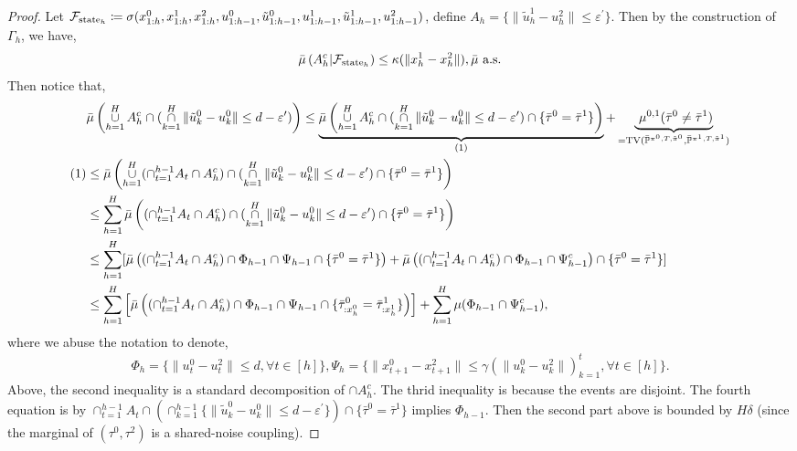 \documentclass{article}
\begin{document}
\begin{proof}
Let $\mathcal F_{\textnormal{state}_h}\coloneqq \sigma(x^0_{1:h},x^1_{1:h},x_{1:h}^2,u_{1:h-1}^{0},\tilde u^0_{1:h-1},u^1_{1:h-1},\tilde u^1_{1:h-1}, u_{1:h-1}^2 )$, define $A_h=\{\|\tilde u_h^1-u_h^2\|\leq\varepsilon^\prime\}$.
    Then by the construction of $\Gamma_h$, we have,
    \begin{equation*}
        \bar \mu\left(A_h^c|\mathcal F_{\textnormal{state}_h}\right)\leq\kappa(\|x_h^1-x_h^2\|), \bar \mu \textnormal{ a.s.}
    \end{equation*}
    Then notice that,
    \begin{align*}
        &\bar \mu\left(\mathop{\cup}_{h=1}^H A_h^c\cap (\mathop{\cap}_{k=1}^H \|\tilde u_k^0-u_k^0\| \leq d-\varepsilon^\prime)\right)\leq \underbrace{\bar \mu\left(\mathop{\cup}_{h=1}^H A_h^c\cap (\mathop{\cap}_{k=1}^H \|\tilde u_k^0-u_k^0\| \leq d-\varepsilon^\prime)\cap\{\bar \tau^0=\bar \tau^1\}\right)}_{(1)}+\underbrace{\ \mu^{0,1}(\bar \tau^0 \neq \bar \tau^1)}_{=\textnormal{TV}(\bar {\mathbb P}^{\pi^0,T,\tilde \pi^0},\bar {\mathbb P}^{\pi^1,T,\tilde \pi^1})}\\
(1)&\leq \bar \mu\left(\mathop{\cup}_{h=1}^H (\cap_{t=1}^{h-1}A_t\cap A_h^c)\cap (\mathop{\cap}_{k=1}^H \|\tilde u_k^0-u_k^0\|\leq d-\varepsilon^\prime)\cap\{\bar \tau^0=\bar \tau^1\}\right)\\
        & \leq \sum_{h=1}^H \bar \mu\left((\cap_{t=1}^{h-1}A_t\cap A_h^c)\cap (\mathop{\cap}_{k=1}^H \|\tilde u_k^0-u_k^0\|\leq d-\varepsilon^\prime)\cap\{\bar \tau^0=\bar \tau^1\}\right)\\
        &\leq \sum_{h=1}^H[\bar \mu\left((\cap_{t=1}^{h-1}A_t\cap A_h^c)\cap \Phi_{h-1}\cap \Psi_{h-1}\cap\{\bar \tau^0=\bar \tau^1\}\right)+\bar \mu\left((\cap_{t=1}^{h-1}A_t\cap A_h^c)\cap \Phi_{h-1}\cap \Psi_{h-1}^c\right)\cap\{\bar \tau^0=\bar \tau^1\}]\\
        &\leq \sum_{h=1}^H\left[\bar \mu\left((\cap_{t=1}^{h-1}A_t\cap A_h^c)\cap \Phi_{h-1}\cap \Psi_{h-1}\cap\{\bar \tau^0_{:x_h^0}=\bar \tau^1_{:x_h^1}\}\right)\right]+\sum_{h=1}^H \mu(\Phi_{h-1}\cap \Psi_{h-1}^c),
    \end{align*}
    where we abuse the notation to denote,
\begin{align*}
    \Phi_h = \{\|u_t^0-u_t^2\|\leq d, \forall t\in[h]\}, \Psi_h = \{\|x_{t+1}^0-x_{t+1}^2\|\leq \gamma(\|u^0_k-u^2_k\|)_{k=1}^t,\forall t\in[h]\}.
\end{align*}
    Above, the second inequality is a standard decomposition of $\cap A_h^c$. The thrid inequality is because the events are disjoint. The fourth equation is by $\mathop{\cap}_{t=1}^{h-1}A_t \cap (\mathop{\cap}_{k=1}^{h-1} \{\|\tilde u_k^0-u_k^0\|\leq d-\varepsilon^\prime\})\cap\{\bar \tau^0=\bar \tau^1\}$ implies $\Phi_{h-1}$. Then the second part above is bounded by $H\delta$ (since the marginal of $(\tau^0, \tau^2)$ is a shared-noise coupling).
    

\end{proof}
\end{document}
